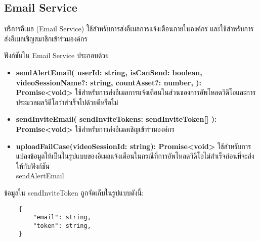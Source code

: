 \subsection{Email Service}

\ifenglish
\else
บริการอีเมล (Email Service) ใช้สำหรับการส่งอีเมลการแจ้งเตือนภายในองค์กร และใช้สำหรับการส่งอีเมลเชิญสมาชิกเข้าร่วมองค์กร

ฟังก์ชันใน Email Service ประกอบด้วย

\begin{itemize}
    \item \textbf{sendAlertEmail(
        userId: string,
        isCanSend: boolean,
        videoSessionName?: string,
        countAsset?: number,
      ): Promise<void>} ใช้สำหรับการส่งอีเมลการแจ้งเตือนในส่วนของการอัพโหลดวิดีโอและการประมวลผลวิดีโอว่าสำเร็จไปด้วยดีหรือไม่
    \item \textbf{sendInviteEmail(
        sendInviteTokens: sendInviteToken[]
      ): Promise<void>} ใช้สำหรับการส่งอีเมลเชิญเข้าร่วมองค์กร
    \item \textbf{uploadFailCase(videoSessionId: string): Promise<void>} ใช้สำหรับการแปลงข้อมูลให้เป็นในรูปแบบของอีเมลแจ้งเตือนในกรณีที่การอัพโหลดวิดีโอไม่สำเร็จก่อนที่จะส่งให้กับฟังก์ชัน \\sendAlertEmail
\end{itemize}

ข้อมูลใน sendInviteToken ถูกจัดเก็บในรูปแบบดังนี้:
\begin{lstlisting}
    {
        "email": string,
        "token": string,
    }
\end{lstlisting}
\fi